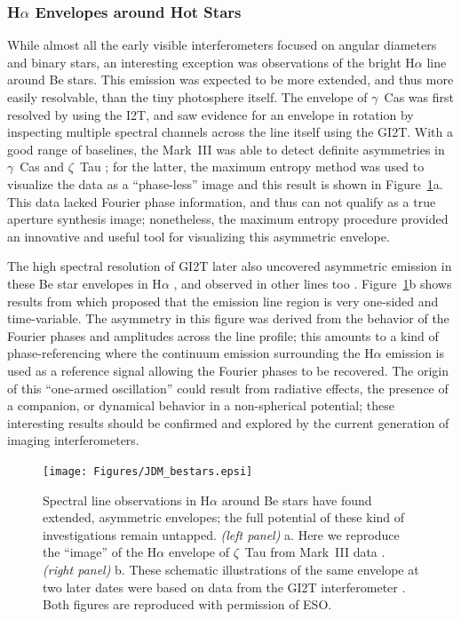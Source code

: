 \documentclass[12pt]{iopart}
\begin{document}
\subsubsection{H$\alpha$ Envelopes around Hot Stars}
\label{halpha}
While almost all the early visible interferometers focused on angular
diameters and binary stars, an interesting exception was observations
of the bright H$\alpha$ line around Be stars.  This emission was
expected to be more extended, and thus more easily resolvable, than
the tiny photosphere itself.  The envelope of $\gamma$~Cas was first
resolved by \citet{thom1986} using the I2T, and \citet{mourard1989}
saw evidence for an envelope in rotation by inspecting multiple
spectral channels across the line itself using the GI2T.  With a good
range of baselines, the Mark~III was able to detect definite
asymmetries in $\gamma$~Cas and $\zeta$~Tau
\citep{quirrenbach1993b,quirrenbach1994}; for the latter, the maximum
entropy method was used to visualize the data as a ``phase-less''
image and this result is shown in Figure~\ref{bestars}a.  This data
lacked Fourier phase information, and thus can not qualify as a true
aperture synthesis image; nonetheless, the maximum entropy procedure
provided an innovative and useful tool for visualizing this asymmetric
envelope.

The high spectral resolution of GI2T later also uncovered asymmetric
emission in these Be star envelopes in H$\alpha$ \citep{stee1995}, and
observed in other lines too \citep{stee1998}.  Figure~\ref{bestars}b
shows results from \citet{vakili1998} \citep[see also][]{berio1999}
which proposed that the emission line region is very one-sided and
time-variable.  The asymmetry in this figure was derived from the
behavior of the Fourier phases and amplitudes across the line profile;
this amounts to a kind of phase-referencing where the continuum
emission surrounding the H$\alpha$ emission is used as a reference
signal allowing the Fourier phases to be recovered.  The origin of this
``one-armed oscillation'' could result from radiative effects, the presence of
a companion, or dynamical behavior in a non-spherical potential; these
interesting results should be confirmed and explored by the
current generation of imaging interferometers.

\begin{figure}[tbhp]
\begin{center}
\texttt{[image: Figures/JDM\_bestars.epsi]}
\caption{\footnotesize 
  Spectral line observations in H$\alpha$ around Be stars have found
  extended, asymmetric envelopes; the full potential of these kind of
  investigations remain untapped. {\em (left panel)} a. Here we reproduce
  the ``image'' of the H$\alpha$ envelope of $\zeta$~Tau from Mark~III
  data \citep[Figure 3 from][]{quirrenbach1994}.  {\em (right panel)} b.
  These schematic illustrations of the same envelope at two later
  dates were based on data from the GI2T interferometer \citep[see
  Figure~4 from][]{vakili1998}.  Both figures are reproduced with
  permission of ESO.
\label{bestars}}
\end{center}
\end{figure}
\end{document}
